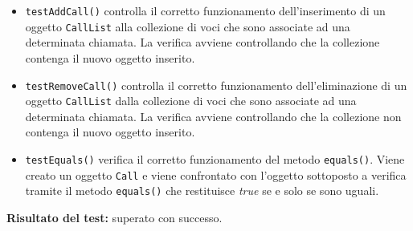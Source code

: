 \begin{itemize}
\begin{itemize}
\item \texttt{testAddCall()} controlla il corretto funzionamento dell'inserimento di un oggetto \texttt{CallList} alla collezione di voci che sono associate ad una determinata chiamata. La verifica avviene controllando che la collezione contenga il nuovo oggetto inserito.

\item \texttt{testRemoveCall()} controlla il corretto funzionamento dell'eliminazione di un oggetto \texttt{CallList} dalla collezione di voci che sono associate ad una determinata chiamata. La verifica avviene controllando che la collezione non contenga il nuovo oggetto inserito.

\item \texttt{testEquals()}
verifica il corretto funzionamento del metodo \texttt{equals()}. Viene creato un oggetto \texttt{Call} e viene confrontato con l'oggetto sottoposto a verifica tramite il metodo \texttt{equals()} che restituisce \textit{true} se e solo se sono uguali.
 
\end{itemize}
\textbf{Risultato del test:} superato con successo.


\end{itemize}

